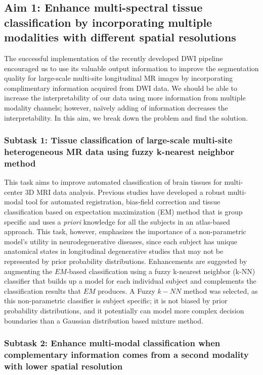 \subsection{Aim 1: Enhance multi-spectral tissue classification by incorporating multiple modalities with different spatial resolutions}

The successful implementation of the recently developed DWI pipeline encouraged us to use its valuable output information to improve the segmentation quality for large-scale multi-site longitudinal MR images by incorporating complimentary information acquired from DWI data.
We should be able to increase the interpretability of our data using more information from multiple modality channels; however, na\"{i}vely adding of information decreases the interpretability. In this aim, we break down the problem and find the solution.

\subsubsection{Subtask 1: Tissue classification of large-scale multi-site heterogeneous MR data using fuzzy k-nearest neighbor method}

This task aims to improve automated classification of brain tissues for multi-center 3D MRI data analysis. 
Previous studies have developed a robust multi-modal tool for automated registration, bias-field correction and tissue classification based on expectation maximization (EM) method \cite{Kim2013} that is group specific and uses a \emph{priori} knowledge for all the subjects in an atlas-based approach.
This task, however, emphasizes the importance of a non-parametric model's utility in neurodegenerative diseases, since each subject has unique anatomical states in longitudinal degenerative studies that may not be represented by prior probability distributions. Enhancements are suggested by augmenting the $EM$-based classification using a fuzzy k-nearest neighbor (k-NN) classifier that builds up a model for each individual subject and complements the classification results that $EM$ produces.
A Fuzzy $k-NN$ method was selected, as this non-parametric classifier is subject specific; it is not biased by prior probability distributions, and it potentially can model more complex decision boundaries than a Gaussian distribution based mixture method.

\subsubsection{Subtask 2: Enhance multi-modal classification when complementary information comes from a second modality with lower spatial resolution}

